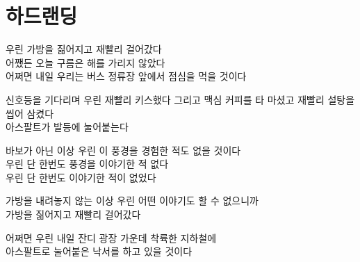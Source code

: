 \begin{article}
\hypertarget{uxd558uxb4dcuxb79cuxb529}{%
\chapter{하드랜딩}\label{uxd558uxb4dcuxb79cuxb529}}

우린 가방을 짊어지고 재빨리 걸어갔다\\
어쨌든 오늘 구름은 해를 가리지 않았다\\
어쩌면 내일 우리는 버스 정류장 앞에서 점심을 먹을 것이다

신호등을 기다리며 우린 재빨리 키스했다 그리고 맥심 커피를 타 마셨고 재빨리 설탕을 씹어 삼켰다\\
아스팔트가 발등에 눌어붙는다

바보가 아닌 이상 우린 이 풍경을 경험한 적도 없을 것이다\\
우린 단 한번도 풍경을 이야기한 적 없다\\
우린 단 한번도 이야기한 적이 없었다

가방을 내려놓지 않는 이상 우린 어떤 이야기도 할 수 없으니까\\
가방을 짊어지고 재빨리 걸어갔다

어쩌면 우린 내일 잔디 광장 가운데 착륙한 지하철에\\
아스팔트로 눌어붙은 낙서를 하고 있을 것이다
\end{article}

